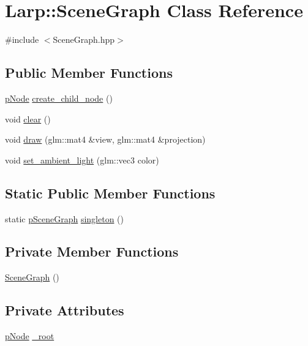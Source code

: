 \hypertarget{classLarp_1_1SceneGraph}{}\section{Larp\+:\+:Scene\+Graph Class Reference}
\label{classLarp_1_1SceneGraph}


{\ttfamily \#include $<$Scene\+Graph.\+hpp$>$}

\subsection*{Public Member Functions}
\begin{DoxyCompactItemize}
\item 
\hyperlink{namespaceLarp_a57e9a3e29e68cdf508c964274d9ac1a4}{p\+Node} \hyperlink{classLarp_1_1SceneGraph_ae5e5217dc191780b0e7a05fe2b490d90}{create\+\_\+child\+\_\+node} ()
\item 
void \hyperlink{classLarp_1_1SceneGraph_a21ef2624b18a0e9a0df2ee52db762447}{clear} ()
\item 
void \hyperlink{classLarp_1_1SceneGraph_a8113f5f330d20c966c5f2403e1e6386b}{draw} (glm\+::mat4 \&view, glm\+::mat4 \&projection)
\item 
void \hyperlink{classLarp_1_1SceneGraph_a3b99e07a52de26cb627e4f6e908a2299}{set\+\_\+ambient\+\_\+light} (glm\+::vec3 color)
\end{DoxyCompactItemize}
\subsection*{Static Public Member Functions}
\begin{DoxyCompactItemize}
\item 
static \hyperlink{namespaceLarp_a590f73362521ab6a9c682d4eb2719002}{p\+Scene\+Graph} \hyperlink{classLarp_1_1SceneGraph_a5a34524c135b74f97a699aef4dc146b5}{singleton} ()
\end{DoxyCompactItemize}
\subsection*{Private Member Functions}
\begin{DoxyCompactItemize}
\item 
\hyperlink{classLarp_1_1SceneGraph_a256e0ff974a0f905a848a99f18b7ffc4}{Scene\+Graph} ()
\end{DoxyCompactItemize}
\subsection*{Private Attributes}
\begin{DoxyCompactItemize}
\item 
\hyperlink{namespaceLarp_a57e9a3e29e68cdf508c964274d9ac1a4}{p\+Node} \hyperlink{classLarp_1_1SceneGraph_adf33065344039fd7fce5f828e800137f}{\+\_\+root}
\end{DoxyCompactItemize}
